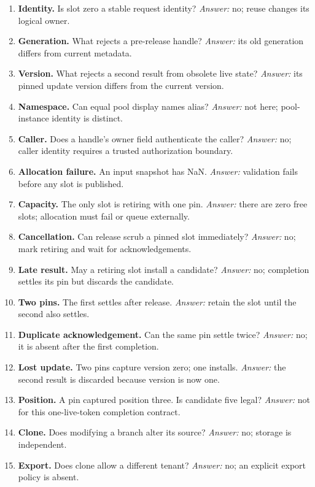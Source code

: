 \begin{enumerate}
\item \textbf{Identity.} Is slot zero a stable request identity?
\emph{Answer:} no; reuse changes its logical owner.
\item \textbf{Generation.} What rejects a pre-release handle?
\emph{Answer:} its old generation differs from current metadata.
\item \textbf{Version.} What rejects a second result from obsolete live state?
\emph{Answer:} its pinned update version differs from the current version.
\item \textbf{Namespace.} Can equal pool display names alias?
\emph{Answer:} not here; pool-instance identity is distinct.
\item \textbf{Caller.} Does a handle's owner field authenticate the caller?
\emph{Answer:} no; caller identity requires a trusted authorization boundary.
\item \textbf{Allocation failure.} An input snapshot has NaN.
\emph{Answer:} validation fails before any slot is published.
\item \textbf{Capacity.} The only slot is retiring with one pin.
\emph{Answer:} there are zero free slots; allocation must fail or queue externally.
\item \textbf{Cancellation.} Can release scrub a pinned slot immediately?
\emph{Answer:} no; mark retiring and wait for acknowledgements.
\item \textbf{Late result.} May a retiring slot install a candidate?
\emph{Answer:} no; completion settles its pin but discards the candidate.
\item \textbf{Two pins.} The first settles after release.
\emph{Answer:} retain the slot until the second also settles.
\item \textbf{Duplicate acknowledgement.} Can the same pin settle twice?
\emph{Answer:} no; it is absent after the first completion.
\item \textbf{Lost update.} Two pins capture version zero; one installs.
\emph{Answer:} the second result is discarded because version is now one.
\item \textbf{Position.} A pin captured position three. Is candidate five legal?
\emph{Answer:} not for this one-live-token completion contract.
\item \textbf{Clone.} Does modifying a branch alter its source?
\emph{Answer:} no; storage is independent.
\item \textbf{Export.} Does clone allow a different tenant?
\emph{Answer:} no; an explicit export policy is absent.

\end{enumerate}
